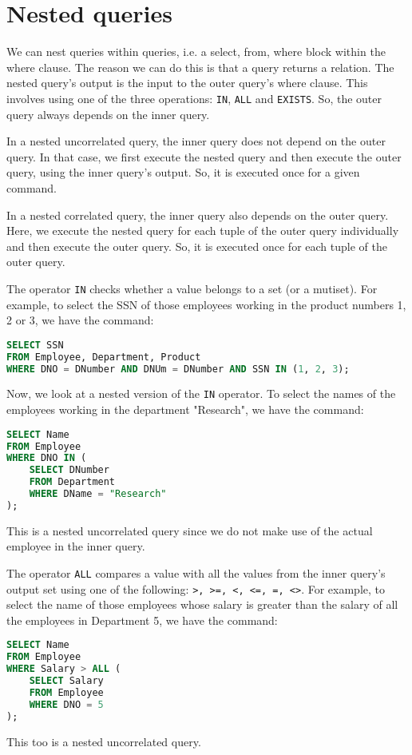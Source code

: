 \documentclass[a4paper, openany]{memoir}
\begin{document}
\section{Nested queries}
We can nest queries within queries, i.e. a select, from, where block within the where clause. The reason we can do this is that a query returns a relation. The nested query's output is the input to the outer query's where clause. This involves using one of the three operations: \texttt{IN}, \texttt{ALL} and \texttt{EXISTS}. So, the outer query always depends on the inner query. 

In a nested uncorrelated query, the inner query does not depend on the outer query. In that case, we first execute the nested query and then execute the outer query, using the inner query's output. So, it is executed once for a given command. 

In a nested correlated query, the inner query also depends on the outer query. Here, we execute the nested query for each tuple of the outer query individually and then execute the outer query. So, it is executed once for each tuple of the outer query.

The operator \texttt{IN} checks whether a value belongs to a set (or a mutiset). For example, to select the SSN of those employees working in the product numbers 1, 2 or 3, we have the command:
\begin{lstlisting}[language=SQL]
SELECT SSN
FROM Employee, Department, Product
WHERE DNO = DNumber AND DNUm = DNumber AND SSN IN (1, 2, 3);
\end{lstlisting}
Now, we look at a nested version of the \texttt{IN} operator. To select the names of the employees working in the department "Research", we have the command:
\begin{lstlisting}[language=SQL]
SELECT Name
FROM Employee
WHERE DNO IN (
    SELECT DNumber
    FROM Department
    WHERE DName = "Research"
);
\end{lstlisting}
This is a nested uncorrelated query since we do not make use of the actual employee in the inner query.

The operator \texttt{ALL} compares a value with all the values from the inner query's output set using one of the following: \texttt{>, >=, <, <=, =, <>}. For example, to select the name of those employees whose salary is greater than the salary of all the employees in Department 5, we have the command:
\begin{lstlisting}[language=SQL]
SELECT Name
FROM Employee
WHERE Salary > ALL (
    SELECT Salary
    FROM Employee
    WHERE DNO = 5
);
\end{lstlisting}
This too is a nested uncorrelated query.
\end{document}

